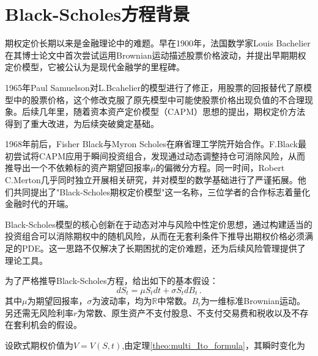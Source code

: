\documentclass[oneside]{sysuthesis}
\begin{document}
\section{Black-Scholes方程背景}

期权定价长期以来是金融理论中的难题。早在1900年，法国数学家Louis Bachelier在其博士论文中首次尝试运用Brownian运动描述股票价格波动\cite{Bachelier2006}，并提出早期期权定价模型，它被公认为是现代金融学的里程碑。

1965年Paul Samuelson对L.Bcahelier的模型进行了修正\cite{Samuelson1965}，用股票的回报替代了原模型中的股票价格，这个修改克服了原先模型中可能使股票价格出现负值的不合理现象。后续几年里，随着资本资产定价模型（CAPM）思想\cite{sharpe1964capm}的提出，期权定价方法得到了重大改进，为后续突破奠定基础。

1968年前后，Fisher Black与Myron Scholes在麻省理工学院开始合作。F.Black最初尝试将CAPM应用于瞬间投资组合，发现通过动态调整持仓可消除风险，从而推导出一个不依赖标的资产期望回报率$\mu$的偏微分方程。同一时间，Robert C.Merton几乎同时独立开展相关研究，并对模型的数学基础进行了严谨拓展。他们共同提出了"Black-Scholes期权定价模型"这一名称\cite{BlackScholes1973}，三位学者的合作标志着量化金融时代的开端。

Black-Scholes模型的核心创新在于动态对冲与风险中性定价思想，通过构建适当的投资组合可以消除期权中的随机风险，从而在无套利条件下推导出期权价格必须满足的PDE。这一思路不仅解决了长期困扰的定价难题，还为后续风险管理提供了理论工具。

为了严格推导Black-Scholes方程，给出如下的基本假设：
\begin{equation*}
	dS_t=\mu S_tdt+\sigma S_tdB_t\,.
\end{equation*}
其中$\mu$为期望回报率，$\sigma$为波动率，均为$\mathbb{R}$中常数。$B_t$为一维标准Brownian运动。另还需无风险利率$r$为常数、原生资产不支付股息、不支付交易费和税收以及不存在套利机会的假设\cite{BlackScholes1973}。

设欧式期权价值为$V=V(S,t)$,由定理\ref{theo:multi_Ito_formula}，其瞬时变化为
\end{document}
